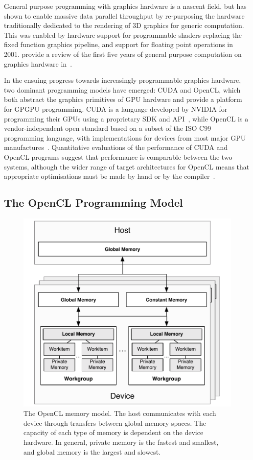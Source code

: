 General purpose programming with graphics hardware is a nascent field,
but has shown to enable massive data parallel throughput by
re-purposing the hardware traditionally dedicated to the rendering of
3D graphics for generic computation. This was enabled by hardware
support for programmable shaders replacing the fixed function graphics
pipeline, and support for floating point operations in
2001. \citeauthor{Owens2006} provide a review of the first five years
of general purpose computation on graphics hardware
in~\cite{Owens2006}.

In the ensuing progress towards increasingly programmable graphics
hardware, two dominant programming models have emerged: CUDA and
OpenCL, which both abstract the graphics primitives of GPU hardware
and provide a platform for GPGPU programming. CUDA is a language
developed by NVIDIA for programming their GPUs using a proprietary SDK
and API~\cite{Nvidia2007}, while OpenCL is a vendor-independent open
standard based on a subset of the ISO C99 programming language, with
implementations for devices from most major GPU
manufactures~\cite{Stone2010}. Quantitative evaluations of the
performance of CUDA and OpenCL programs suggest that performance is
comparable between the two systems, although the wider range of target
architectures for OpenCL means that appropriate optimisations must be
made by hand or by the compiler~\cite{Komatsu2010,Karimi2010}.


\subsection{The OpenCL Programming Model}

\begin{figure}
\centering
\includegraphics[width=0.5
\textwidth]{img/opencl-memory}
\caption[OpenCL memory model]{%
  The OpenCL memory model. The host communicates with each device
  through transfers between global memory spaces. The capacity of each
  type of memory is dependent on the device hardware. In general,
  private memory is the fastest and smallest, and global memory is the
  largest and slowest.%
}
\label{fig:opencl-memory}
\end{figure}

